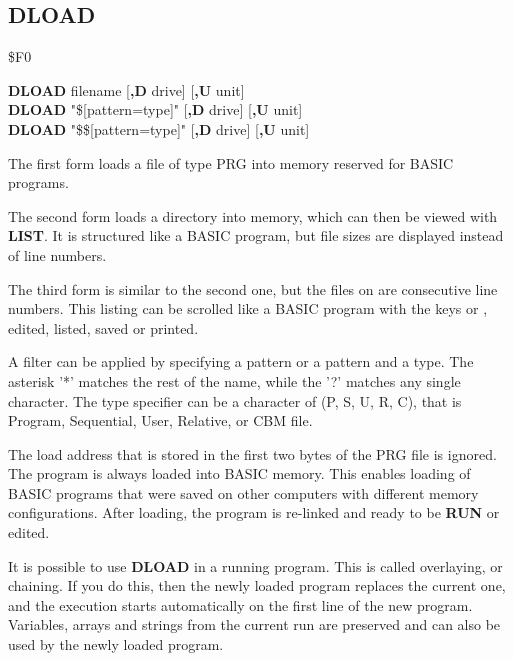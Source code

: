 \subsection{DLOAD}
\begin{description}[leftmargin=2cm,style=nextline]
\item [Token:]    \$F0
\item [Format:]   {\bf DLOAD} filename [{\bf,D} drive] [{\bf,U} unit] \\
                  {\bf DLOAD} "\$[pattern=type]" [{\bf,D} drive] [{\bf,U} unit] \\
                  {\bf DLOAD} "\$\$[pattern=type]" [{\bf,D} drive] [{\bf,U} unit]

\item [Usage:]    The first form loads a file of type PRG into memory reserved for BASIC programs.

                  The second form loads a directory into memory, which can then be viewed with {\bf LIST}. It is structured like a BASIC program, but file sizes are displayed instead of line numbers.

                  The third form is similar to the second one, but the files on are consecutive line numbers. This listing can be scrolled like a BASIC program with the keys  or , edited, listed, saved or printed.

                  A filter can be applied by specifying a pattern or a pattern and a type. The asterisk '*' matches the rest of the name, while the '?' matches any single character. The type specifier can be a character of (P, S, U, R, C), that is Program, Sequential, User, Relative, or CBM file.

                  \filenamedefinition

                  \drivedefinition

                  \unitdefinition

\item [Remarks:]  The load address that is stored in the first two bytes of the PRG file is ignored. The program is always loaded into BASIC memory. This enables loading of BASIC programs that were saved on other computers with different memory configurations. After loading, the program is re-linked and ready to be {\bf RUN} or edited.

                  It is possible to use {\bf DLOAD} in a running program. This is called overlaying, or chaining. If you do this, then the newly loaded program replaces the current one, and the execution starts automatically on the first line of the new program. Variables, arrays and strings from the current run are preserved and can also be used by the newly loaded program.


\end{description}
